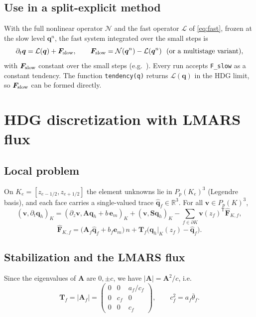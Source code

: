 \documentclass[11pt,a4paper]{article}
\newcommand{\qh}{\hat{\bm q}}
\newcommand{\q}{\bm q}
\newcommand{\thb}{\bar\theta}
\begin{document}
\subsection{Use in a split-explicit method}
With the full nonlinear operator $\mathcal N$ and the fast operator $\mathcal L$ of
\eqref{eq:fast}, frozen at the slow level $\q^n$, the fast system integrated over the small steps is
\begin{equation}
\partial_t\q = \mathcal L(\q) + \bm F_{\rm slow},\qquad
\bm F_{\rm slow}=\mathcal N(\q^n)-\mathcal L(\q^n)\ \ (\text{or a multistage variant}),
\end{equation}
with $\bm F_{\rm slow}$ constant over the small steps (e.g.\ \cite{wicker2002}). Every run accepts
\texttt{F\_slow} as a constant tendency. The function \texttt{tendency(q)} returns $\mathcal L(\q)$
in the HDG limit, so $\bm F_{\rm slow}$ can be formed directly.

\section{HDG discretization with LMARS flux}
\subsection{Local problem}
On $K_e=[z_{e-1/2},z_{e+1/2}]$ the element unknowns lie in $P_p(K_e)^3$ (Legendre basis), and each
face carries a single-valued trace $\qh_f\in\mathbb R^3$. For all $\bm v\in P_p(K)^3$,
\begin{equation}\label{eq:local}
(\bm v,\partial_t\q_h)_K = (\partial_z\bm v,\bm A\q_h+b\,\bm e_m)_K + (\bm v,\bm S\q_h)_K
 - \sum_{f\in\partial K}\bm v(z_f)^{\mathsf T}\widehat{\bm F}_{K,f},
\end{equation}
\begin{equation}\label{eq:hdgflux}
\widehat{\bm F}_{K,f}=\big(\bm A_f\qh_f+b_f\bm e_m\big)\,n+\bm T_f\big(\q_h|_K(z_f)-\qh_f\big).
\end{equation}

\subsection{Stabilization and the LMARS flux}
Since the eigenvalues of $\bm A$ are $0,\pm c$, we have $|\bm A|=\bm A^2/c$, i.e.
\begin{equation}
\bm T_f=|\bm A_f|=\begin{pmatrix}0&0&a_f/c_f\\0&c_f&0\\0&0&c_f\end{pmatrix},\qquad c_f^2=a_f\thb_f .
\end{equation}
\end{document}
